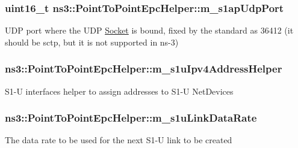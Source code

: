 \subsubsection[{\texorpdfstring{m\+\_\+s1ap\+Udp\+Port}{m_s1apUdpPort}}]{\setlength{\rightskip}{0pt plus 5cm}uint16\+\_\+t ns3\+::\+Point\+To\+Point\+Epc\+Helper\+::m\+\_\+s1ap\+Udp\+Port\hspace{0.3cm}{\ttfamily [private]}}\hypertarget{classns3_1_1PointToPointEpcHelper_a54827f1909b73bb956bb6f12e098c367}{}\label{classns3_1_1PointToPointEpcHelper_a54827f1909b73bb956bb6f12e098c367}
U\+DP port where the U\+DP \hyperlink{classns3_1_1Socket}{Socket} is bound, fixed by the standard as 36412 (it should be sctp, but it is not supported in ns-\/3) 
\subsubsection[{\texorpdfstring{m\+\_\+s1u\+Ipv4\+Address\+Helper}{m_s1uIpv4AddressHelper}}]{ ns3\+::\+Point\+To\+Point\+Epc\+Helper\+::m\+\_\+s1u\+Ipv4\+Address\+Helper\hspace{0.3cm}{\ttfamily [private]}}\hypertarget{classns3_1_1PointToPointEpcHelper_a0566b197857168bbad76f8c72fd849d6}{}\label{classns3_1_1PointToPointEpcHelper_a0566b197857168bbad76f8c72fd849d6}
S1-\/U interfaces helper to assign addresses to S1-\/U Net\+Devices 
\subsubsection[{\texorpdfstring{m\+\_\+s1u\+Link\+Data\+Rate}{m_s1uLinkDataRate}}]{ ns3\+::\+Point\+To\+Point\+Epc\+Helper\+::m\+\_\+s1u\+Link\+Data\+Rate\hspace{0.3cm}{\ttfamily [private]}}\hypertarget{classns3_1_1PointToPointEpcHelper_a0fab7f53e1e32ea56de65de870135ad1}{}\label{classns3_1_1PointToPointEpcHelper_a0fab7f53e1e32ea56de65de870135ad1}
The data rate to be used for the next S1-\/U link to be created 
